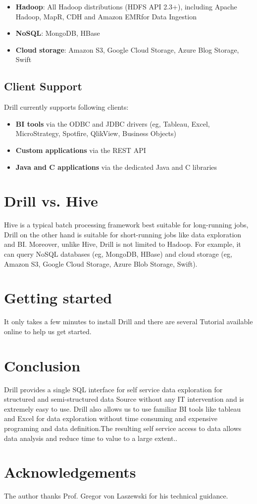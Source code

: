 \documentclass[9pt,twocolumn,twoside]{styles/osajnl}
\begin{document}
\begin{itemize}
	\item \textbf{Hadoop}: All Hadoop distributions (HDFS API 2.3+), including Apache Hadoop, MapR, CDH and Amazon EMRfor Data Ingestion
	\item \textbf{NoSQL}: MongoDB, HBase
	\item \textbf{Cloud storage}: Amazon S3, Google Cloud Storage, Azure Blog Storage, Swift

\end{itemize}

\subsection{Client Support}
Drill currently supports following clients:

\begin{itemize}
	\item \textbf{BI tools} via the ODBC and JDBC drivers (eg, Tableau, Excel, MicroStrategy, Spotfire, QlikView, Business Objects)
	\item \textbf{Custom applications} via the REST API
	\item \textbf{Java and C applications} via the dedicated Java and C libraries
	
\end{itemize}

\section{Drill vs. Hive}
Hive is a typical batch processing framework best suitable for long-running jobs, Drill 
on the other hand is suitable for short-running jobs like data exploration and BI.
Moreover, unlike Hive, Drill is not limited to Hadoop. For example, it can query NoSQL databases (eg, MongoDB, HBase) and cloud storage (eg, Amazon S3, Google Cloud Storage, Azure Blob Storage, Swift).

\section{Getting started}
It only takes a few minutes to install Drill and there are several Tutorial \cite{Tutorial} available online to help us get started.

\section{Conclusion}
Drill provides a single SQL interface for self service data exploration for structured and semi-structured data Source without any IT intervention and is extremely easy to use. Drill also allows us to use familiar BI tools like tableau and Excel for data exploration without time consuming and expensive programing and data definition.The resulting self service access to data allows data analysis and reduce time to value to a large extent..

\section*{Acknowledgements}

The author thanks Prof. Gregor von Laszewski for his technical guidance.



\end{document}
